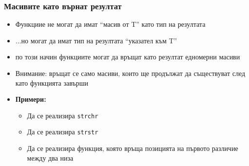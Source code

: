\documentclass{beamer}
\begin{document}
\begin{frame}
  \frametitle{Масивите като върнат резултат}

  \begin{itemize}[<+->]
  \item Функциие \alert{не могат} да имат ``масив от T'' като тип на резултата
  \item ...но могат да имат тип на резултата ``указател към T''
  \item по този начин функциите могат да връщат като резултат \alert{едномерни масиви}
  \item \alert{Внимание:} връщат се само масиви, които ще продължат да съществуват след като функцията завърши
  \item \textbf{Примери:}
    \begin{itemize}
    \item Да се реализира \tt{strchr}
    \item Да се реализира \tt{strstr}
    \item Да се реализира функция, която връща позицията на първото различие между два низа
    \end{itemize}
  \end{itemize}
\end{frame}
\end{document}
